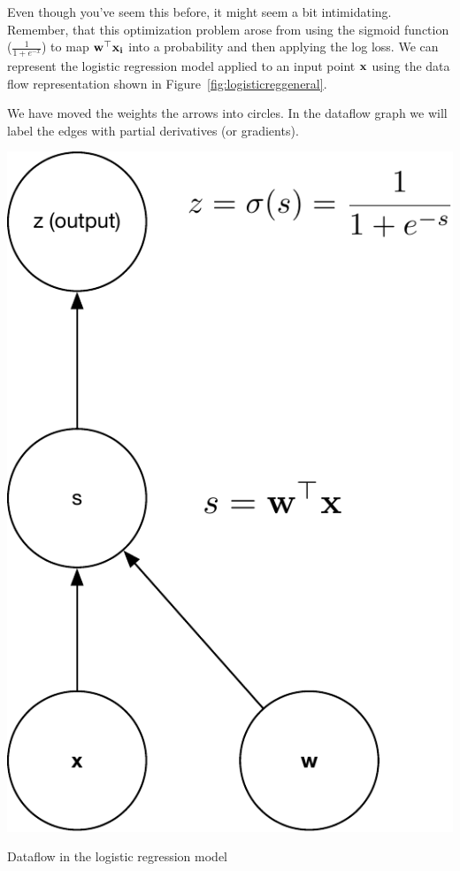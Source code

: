 \documentclass[assignment06_Solutions]{subfiles}
\begin{document}
Even though you've seem this before, it might seem a bit intimidating.  Remember, that this optimization problem arose from using the sigmoid function ($\frac{1}{1+e^{-x}}$) to map $\mathbf{w}^\top \mathbf{x_i}$ into a probability and then applying the log loss.  We can represent the logistic regression model applied to an input point $\mathbf{x}$ using the data flow representation shown in Figure~\ref{fig:logisticreggeneral}.
\begin{notice}
We have moved the weights the arrows into circles.  In the dataflow graph we will label the edges with partial derivatives (or gradients).
\end{notice}
\begin{marginfigure}
\includegraphics[width=\linewidth]{figures/logisticregressiongeneral}\label{fig:logisticreggeneral}
\caption{Dataflow in the logistic regression model}
\end{marginfigure}
\end{document}

